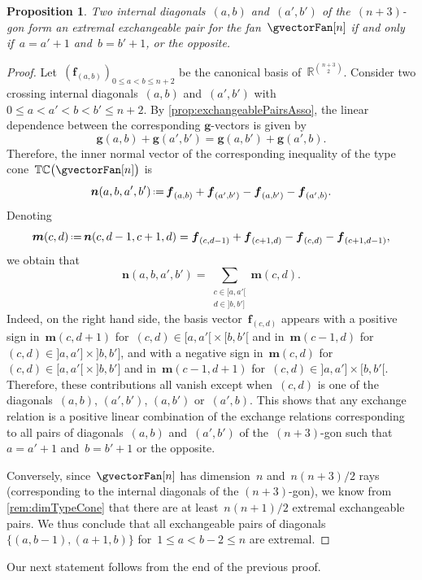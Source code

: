 \documentclass{amsart}
\newtheorem{proposition}[theorem]{Proposition}
\theoremstyle{definition}
\newcommand{\R}{\mathbb{R}} %
\renewcommand{\b}[1]{{\boldsymbol{#1}}} %
\newcommand{\eqdef}{\mbox{\,\raisebox{0.2ex}{\scriptsize\ensuremath{\mathrm:}}\ensuremath{=}\,}} %
\newcommand{\gvector}[1]{\b{g}(#1)} %
\newcommand{\typeCone}{\mathbb{TC}} %
\begin{document}
\begin{proposition}
\label{prop:extremalExchangeablePairsAsso}
Two internal diagonals~$(a,b)$ and~$(a',b')$ of the~$(n+3)$-gon form an extremal exchangeable pair for the fan~$\gvectorFan[n]$ if and only if~$a = a'+1$ and~$b = b'+1$, or the opposite.
\end{proposition}

\begin{proof}
Let~$(\b{f}_{(a,b)})_{0 \le a < b \le n+2}$ be the canonical basis of~$\R^{\binom{n+3}{2}}$.
Consider two crossing internal diagonals~$(a,b)$ and~$(a',b')$ with~$0 \le a < a' < b < b' \le n+2$.
By \cref{prop:exchangeablePairsAsso}, the linear dependence between the corresponding $\b{g}$-vectors is given by
\[
\gvector{a,b} + \gvector{a',b'} = \gvector{a,b'} + \gvector{a',b}.
\]
Therefore, the inner normal vector of the corresponding inequality of the type cone~$\typeCone \big( \gvectorFan[n] \big)$ is
\[
\b{n}(a,b,a',b') \eqdef \b{f}_{(a,b)} + \b{f}_{(a',b')} - \b{f}_{(a,b')} - \b{f}_{(a',b)}.
\]
Denoting
\[
\b{m}(c,d) \eqdef \b{n}(c,d-1,c+1,d) = \b{f}_{(c,d-1)} + \b{f}_{(c+1,d)} - \b{f}_{(c,d)} - \b{f}_{(c+1,d-1)},
\]
we obtain that
\[
\b{n}(a,b,a',b') = \sum_{\substack{c \in {[a,a'[} \\ d \in {]b,b']}}} \b{m}(c,d).
\]
Indeed, on the right hand side, the basis vector~$\b{f}_{(c,d)}$ appears with a positive sign in~$\b{m}(c,d+1)$ for~$(c,d) \in {[a,a'[} \times {[b,b'[}$ and in~$\b{m}(c-1,d)$ for~$(c,d) \in {]a,a']} \times {]b,b']}$, and with a negative sign in~$\b{m}(c,d)$ for~$(c,d) \in {[a,a'[} \times {]b,b']}$ and in~$\b{m}(c-1,d+1)$ for~$(c,d) \in {]a,a']} \times {[b,b'[}$.
Therefore, these contributions all vanish except when~$(c,d)$ is one of the diagonals~$(a,b)$, $(a',b')$, $(a,b')$ or~$(a',b)$.
This shows that any exchange relation is a positive linear combination of the exchange relations corresponding to all pairs of diagonals~$(a,b)$ and~$(a',b')$ of the~$(n+3)$-gon such that~$a = a'+1$ and~$b = b'+1$ or the opposite.

Conversely, since~$\gvectorFan[n]$ has dimension~$n$ and~$n(n+3)/2$ rays (corresponding to the internal diagonals of the $(n+3)$-gon), we know from \cref{rem:dimTypeCone} that there are at least~$n(n+1)/2$ extremal exchangeable pairs. We thus conclude that all exchangeable pairs of diagonals~$\{(a,b-1), (a+1,b)\}$ for~$1 \le a < b-2 \le n$ are extremal.
\end{proof}

Our next statement follows from the end of the previous proof.
\end{document}
